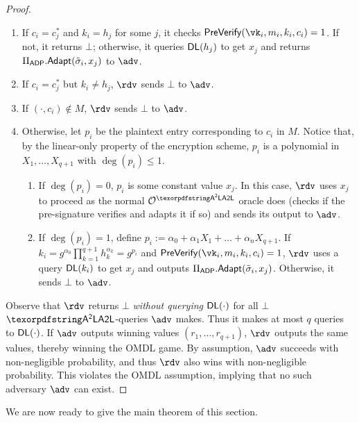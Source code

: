 \begin{proof}
    \begin{enumerate}
        \item If $c_i = c_j^*$ and $k_i = h_j$ for some $j$, it checks $\prevrfy(\vk_i,m_i,k_i,c_i) = 1$. If not, it returns $\bot$; otherwise, it queries ${\mathsf{DL}}(h_j)$ to get $x_j$ and returns $\Pi_{\mathsf{ADP}}.\mathsf{Adapt}(\tilde{\sigma}_i,x_j)$ to $\adv$.
        \item If $c_i = c_j^*$ but $k_i \neq h_j$, $\rdv$ sends $\bot$ to $\adv$.
        \item If $(\cdot, c_i) \notin M$, $\rdv$ sends $\bot$ to $\adv$. 
        \item Otherwise, let $p_i$ be the plaintext entry corresponding to $c_i$ in $M$. Notice that, by the linear-only property of the encryption scheme, $p_i$ is a polynomial in $X_1, \ldots, X_{q+1}$ with $\deg(p_i) \leq 1$.
        \begin{enumerate}
            \item If $\deg(p_i) = 0$, $p_i$ is some constant value $x_j$. In this case, $\rdv$ uses $x_j$ to proceed as the normal $\oracle^\AAL$ oracle does (checks if the pre-signature verifies and adapts it if so) and sends its output to $\adv$.
            \item If $\deg(p_i) = 1$, define $p_i := \alpha_0 + \alpha_1 X_1 + \ldots + \alpha_n X_{q+1}$. If $k_i = g^{\alpha_0}\prod_{k=1}^{q+1} h_k^{\alpha_k} = g^{p_i}$ and $\prevrfy(\vk_i,m_i,k_i,c_i)=1$, $\rdv$ uses a query ${\mathsf{DL}}(k_i)$ to get $x_j$ and outputs $\Pi_{\mathsf{ADP}}.\mathsf{Adapt}(\tilde{\sigma}_i,x_j)$. Otherwise, it sends $\bot$ to $\adv$.
        \end{enumerate}
    \end{enumerate}
    
    Observe that $\rdv$ returns $\bot$ \emph{without querying ${\mathsf{DL}}(\cdot)$} for all $\bot$ $\AAL$-queries $\adv$ makes. Thus it makes at most $q$ queries to ${\mathsf{DL}}(\cdot)$.
    If $\adv$ outputs winning values $(r_1, \ldots, r_{q+1})$, $\rdv$ outputs the same values, thereby winning the OMDL game. By assumption, $\adv$ succeeds with non-negligible probability, and thus $\rdv$ also wins with non-negligible probability. This violates the OMDL assumption, implying that no such adversary $\adv$ can exist.
    \end{proof}

We are now ready to give the main theorem of this section.

